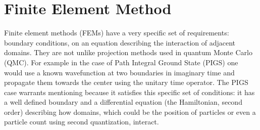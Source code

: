 \documentclass[12pt,times,twocolumn,3p]{elsarticle}
\begin{document}
\section{Finite Element Method} \label{sec:fem}
Finite element methods (FEMs) have a very specific set of requirements: boundary
conditions, on an equation describing the interaction of adjacent domains. They
are not unlike projection methods used in quantum Monte Carlo (QMC). For example
in the case of Path Integral Ground State (PIGS) \cite{pigs} one would use a
known wavefunction at two boundaries in  imaginary time and propagate them towards
the center using the unitary time operator. The PIGS case warrants mentioning
because it satisfies this specific set of conditions: it has a well defined
boundary and a differential equation (the Hamiltonian, second order) describing
how domains, which could be the position of particles or even a particle count
using second quantization, interact.
\end{document}
